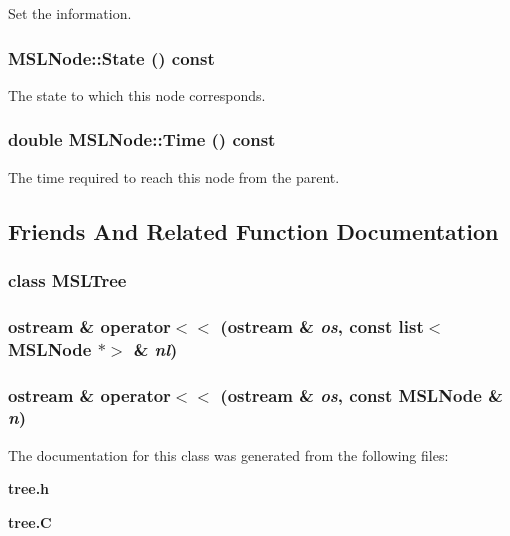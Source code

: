 Set the information.

\subsubsection{ MSLNode::State () const\hspace{0.3cm}{\tt  [inline]}}\label{classMSLNode_a0}


The state to which this node corresponds.

\subsubsection{\setlength{\rightskip}{0pt plus 5cm}double MSLNode::Time () const\hspace{0.3cm}{\tt  [inline]}}\label{classMSLNode_a4}


The time required to reach this node from the parent.



\subsection{Friends And Related Function Documentation}
\subsubsection{\setlength{\rightskip}{0pt plus 5cm}class MSLTree\hspace{0.3cm}{\tt  [friend]}}\label{classMSLNode_l0}


\subsubsection{\setlength{\rightskip}{0pt plus 5cm}ostream \& operator$<$$<$ (ostream \& {\em os}, const {\bf list}$<$ MSLNode $\ast$$>$ \& {\em nl})\hspace{0.3cm}{\tt  [friend]}}\label{classMSLNode_l2}


\subsubsection{\setlength{\rightskip}{0pt plus 5cm}ostream \& operator$<$$<$ (ostream \& {\em os}, const MSLNode \& {\em n})\hspace{0.3cm}{\tt  [friend]}}\label{classMSLNode_l1}




The documentation for this class was generated from the following files:\begin{CompactItemize}
\item 
{\bf tree.h}\item 
{\bf tree.C}\end{CompactItemize}
